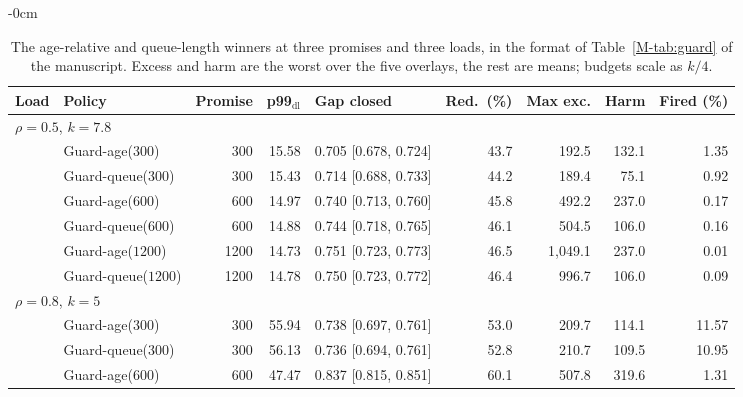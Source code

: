 \documentclass[mathematics,supfile,submit,moreauthors]{Definitions/mdpi}
\newcommand{\devnum}[1]{#1}
\begin{document}
\begin{table}[H]
\begin{adjustwidth}{-\extralength}{0cm}
\centering
\caption{The age-relative and queue-length winners at three promises and three loads, in
the format of Table~\ref*{M-tab:guard} of the manuscript. Excess and harm are the worst over the five
overlays, the rest are means; budgets scale as $k/4$.}
\label{tab:s_guard_abl}
\small
\setlength{\tabcolsep}{3pt}
\begin{tabular}{llrrlrrrr}
\toprule
Load & Policy & Promise & p99$_{\mathrm{dl}}$ & Gap closed & Red.\ (\%) & Max exc. & Harm & Fired (\%) \\
\midrule
\multicolumn{9}{l}{$\rho = 0.5$, $k = 7.8$} \\
 & Guard-age($\devnum{300}$)  & \devnum{300} & \devnum{15.58} & \devnum{0.705 [0.678, 0.724]} & \devnum{43.7} & \devnum{192.5} & \devnum{132.1} & \devnum{1.35} \\
 & Guard-queue($\devnum{300}$) & \devnum{300} & \devnum{15.43} & \devnum{0.714 [0.688, 0.733]} & \devnum{44.2} & \devnum{189.4} & \devnum{75.1} & \devnum{0.92} \\
 & Guard-age($\devnum{600}$)  & \devnum{600} & \devnum{14.97} & \devnum{0.740 [0.713, 0.760]} & \devnum{45.8} & \devnum{492.2} & \devnum{237.0} & \devnum{0.17} \\
 & Guard-queue($\devnum{600}$) & \devnum{600} & \devnum{14.88} & \devnum{0.744 [0.718, 0.765]} & \devnum{46.1} & \devnum{504.5} & \devnum{106.0} & \devnum{0.16} \\
 & Guard-age($\devnum{1200}$) & \devnum{1200} & \devnum{14.73} & \devnum{0.751 [0.723, 0.773]} & \devnum{46.5} & \devnum{1{,}049.1} & \devnum{237.0} & \devnum{0.01} \\
 & Guard-queue($\devnum{1200}$) & \devnum{1200} & \devnum{14.78} & \devnum{0.750 [0.723, 0.772]} & \devnum{46.4} & \devnum{996.7} & \devnum{106.0} & \devnum{0.09} \\
\midrule
\multicolumn{9}{l}{$\rho = 0.8$, $k = 5$} \\
 & Guard-age($\devnum{300}$)  & \devnum{300} & \devnum{55.94} & \devnum{0.738 [0.697, 0.761]} & \devnum{53.0} & \devnum{209.7} & \devnum{114.1} & \devnum{11.57} \\
 & Guard-queue($\devnum{300}$) & \devnum{300} & \devnum{56.13} & \devnum{0.736 [0.694, 0.761]} & \devnum{52.8} & \devnum{210.7} & \devnum{109.5} & \devnum{10.95} \\
 & Guard-age($\devnum{600}$)  & \devnum{600} & \devnum{47.47} & \devnum{0.837 [0.815, 0.851]} & \devnum{60.1} & \devnum{507.8} & \devnum{319.6} & \devnum{1.31} \\

\end{tabular}
\end{adjustwidth}
\end{table}
\end{document}
